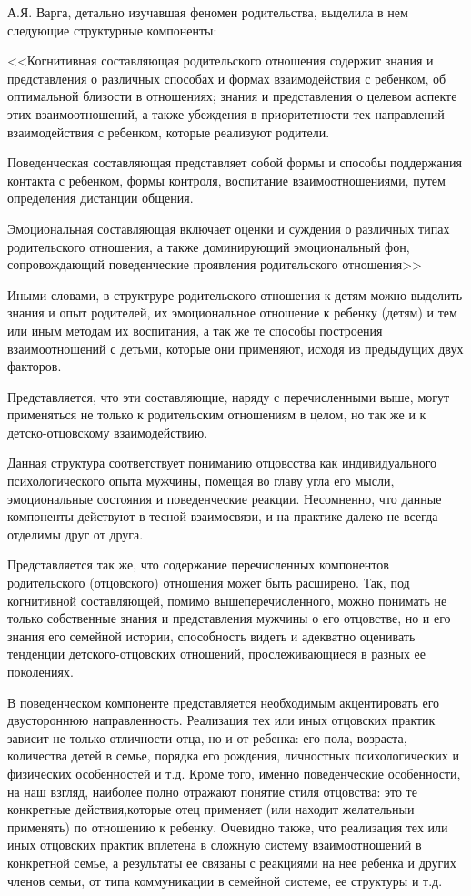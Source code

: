 \documentclass{../../common/thesisbyxetex}
\begin{document}
А.Я. Варга, детально изучавшая феномен родительства, выделила в нем следующие структурные
компоненты:

<<Когнитивная составляющая родительского отношения содержит знания и
представления о различных способах и формах взаимодействия с ребенком, об
оптимальной близости в отношениях; знания и представления о целевом аспекте этих
взаимоотношений, а также убеждения в приоритетности тех направлений
взаимодействия с ребенком, которые реализуют родители.

Поведенческая составляющая представляет собой формы и способы поддержания
контакта с ребенком, формы контроля, воспитание взаимоотношениями, путем
определения дистанции общения.

Эмоциональная составляющая включает оценки и суждения о различных типах
родительского отношения, а также доминирующий эмоциональный фон,
сопровождающий поведенческие проявления родительского отношения>> \cite{varga}

Иными словами, в структруре родительского отношения к детям можно выделить знания и опыт родителей,
их эмоциональное отношение к ребенку (детям) и тем или иным методам их воспитания, а так же те
способы построения взаимоотношений с детьми,
которые они применяют, исходя из предыдущих двух факторов.

Представляется, что эти составляющие,
наряду с перечисленными выше, могут применяться не только к родительским отношениям в целом, но
так же и к детско-отцовскому взаимодействию.

Данная структура соответствует пониманию отцовсства как индивидуального психологического опыта
мужчины, помещая во главу угла его мысли, эмоциональные состояния и поведенческие реакции.
Несомненно, что данные компоненты действуют в тесной взаимосвязи, и на практике далеко не всегда
отделимы друг от друга.

Представляется так же, что содержание перечисленных компонентов родительского (отцовского)
отношения может быть расширено. Так, под когнитивной составляющей, помимо вышеперечисленного, можно
понимать не только собственные знания и представления мужчины о его отцовстве, но и его
знания его семейной истории, способность видеть и адекватно оценивать тенденции детского-отцовских
отношений, прослеживающиеся в разных ее поколениях.

В поведенческом компоненте
представляется необходимым акцентировать его двустороннюю направленность. Реализация тех или иных
отцовских практик зависит не только отличности отца, но и от ребенка: его пола, возраста, количества
детей в семье, порядка его рождения, личностных психологических и физических особенностей и т.д.
Кроме того, именно поведенческие особенности, на наш взгляд, наиболее полно отражают понятие
стиля отцовства: это те конкретные действия,которые отец применяет (или находит желательныи
применять) по отношению к ребенку. Очевидно также, что реализация тех или иных отцовских практик
вплетена в
сложную систему взаимоотношений в конкретной семье, а результаты ее связаны с реакциями на
нее ребенка и других членов семьи, от типа коммуникации в семейной системе, ее структуры и т.д.
\end{document}
